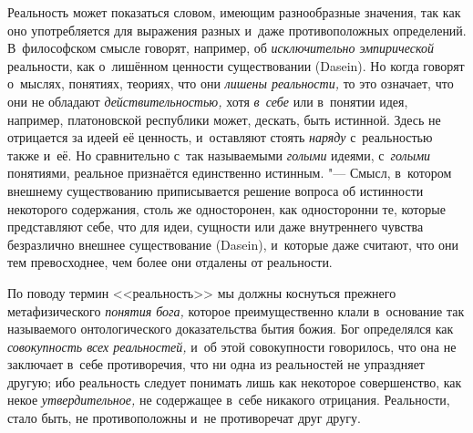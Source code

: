 
\label{bkm:bm73a}Реальность может показаться словом, имеющим разнообразные
значения, так как оно употребляется для выражения разных и~даже противоположных
определений. В~философском смысле говорят, например, об {\em исключительно
эмпирической} реальности, как о~лишённом ценности существовании (Dasein). Но
когда говорят о~мыслях, понятиях, теориях, что они {\em лишены реальности,} то
это означает, что они не обладают {\em действительностью,} хотя {\em в~себе}
или в~понятии идея, например, платоновской республики может, дескать, быть
истинной. Здесь не отрицается за идеей её ценность, и~оставляют стоять
{\em наряду} с~реальностью также и~её. Но сравнительно с~так называемыми
{\em голыми} идеями, с~{\em голыми} понятиями, реальное признаётся единственно
истинным. "--- Смысл, в~котором внешнему существованию приписывается решение
вопроса об истинности некоторого содержания, столь же односторонен, как
односторонни те, которые представляют себе, что для идеи, сущности или даже
внутреннего чувства безразлично внешнее существование (Dasein), и~которые даже
считают, что они тем превосходнее, чем более они отдалены от реальности.

По поводу термин <<реальность>> мы должны коснуться прежнего метафизического
{\em понятия бога,} которое преимущественно клали в~основание так называемого
онтологического доказательства бытия божия. Бог определялся как
{\em совокупность всех реальностей,} и~об этой совокупности говорилось, что она
не заключает в~себе противоречия, что ни одна из реальностей не упраздняет
другую; ибо реальность следует понимать лишь как некоторое совершенство, как
некое {\em утвердительное,} не содержащее в~себе никакого отрицания.
Реальности, стало быть, не противоположны и~не противоречат друг другу.

